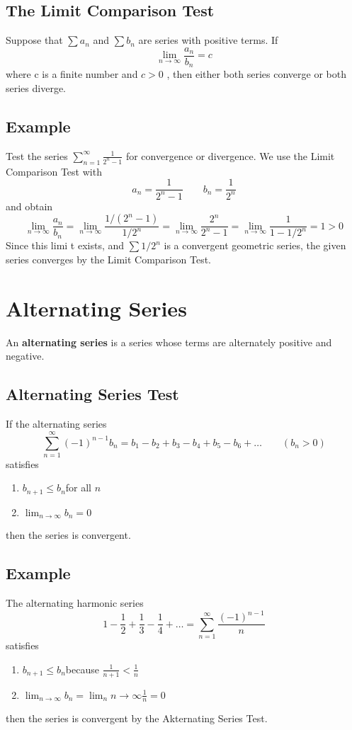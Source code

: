 \subsection*{The Limit Comparison Test}
Suppose that $\textstyle\sum a_n$ and $\textstyle\sum b_n$ are series with positive terms. If $$\lim_{n\rightarrow\infty} \frac{a_n}{b_n} = c$$ 
where c is a finite number and $c > 0$ , then either both series converge or both series diverge.
\subsection*{Example}
Test the series $\sum^\infty_{n = 1} \frac{1}{2^n - 1}$ for convergence or divergence.
We use the Limit Comparison Test with $$a_n = \frac{1}{2^n - 1}\qquad b_n = \frac{1}{2^n}$$
and obtain $$\lim_{n\rightarrow\infty} \frac{a_n}{b_n} = \lim_{n\rightarrow\infty}\frac{1/(2^n - 1)}{1/2^n} = \lim_{n\rightarrow\infty}\frac{2^n}{2^n - 1} = \lim_{n\rightarrow\infty}\frac{1}{1-1/2^n} = 1 > 0$$
Since this limi t exists, and $\textstyle\sum 1/2^n$ is a convergent geometric series, the given series converges by the Limit Comparison Test.
\section{Alternating Series}
An \textbf{alternating series} is a series whose terms are alternately positive and negative.
\subsection*{Alternating Series Test} If the alternating series 
$$\sum^\infty_{n = 1} (-1)^{n-1}b_n = b_1 - b_2 + b_3 - b_4 + b_5 - b_6 + \dots\qquad (b_n > 0)$$
satisfies
\begin{enumerate}
    \item $b_{n + 1}\leq b_n$\qquad for all $n$
    \item $\lim_{n\rightarrow\infty}b_n = 0$
\end{enumerate} then the series is convergent. 
\subsection*{Example} The alternating harmonic series $$1 - \frac{1}{2} + \frac{1}{3} - \frac{1}{4} + \dots = \sum^\infty_{n = 1}\frac{(-1)^{n-1}}{n}$$
satisfies 
\begin{enumerate}
    \item $b_{n + 1}\leq b_n$\qquad because $\frac{1}{n+1} < \frac{1}{n}$
    \item $\lim_{n\rightarrow\infty}b_n = \lim_n{n\rightarrow\infty}\frac{1}{n} = 0$
\end{enumerate} then the series is convergent by the Akternating Series Test. 

